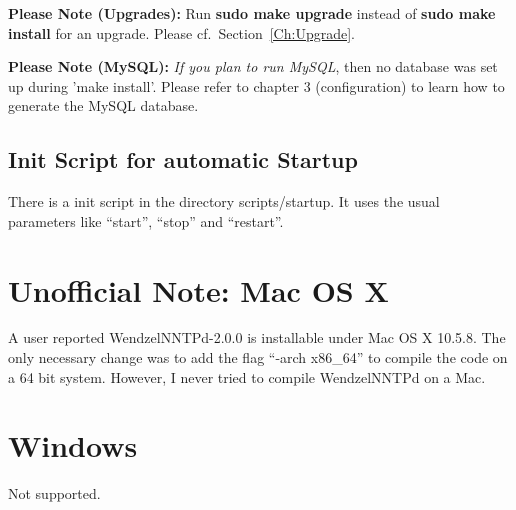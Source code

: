{\bf Please Note (Upgrades):} Run {\bf sudo make upgrade} instead of {\bf sudo make install} for an upgrade. Please cf.\ Section~\ref{Ch:Upgrade}.

{\bf Please Note (MySQL):} {\it If you plan to run MySQL}, then no database was set up during 'make install'. Please refer to chapter 3 (configuration) to learn how to generate the MySQL database.

\subsection{Init Script for automatic Startup}

There is a init script in the directory scripts/startup. It uses the usual parameters like ``start'', ``stop'' and ``restart''.

\section{Unofficial Note: Mac OS X}

A user reported WendzelNNTPd-2.0.0 is installable under Mac OS X 10.5.8. The only necessary change was to add the flag ``-arch x86\_64'' to compile the code on a 64 bit system. However, I never tried to compile WendzelNNTPd on a Mac.

\section{Windows}

Not supported.



